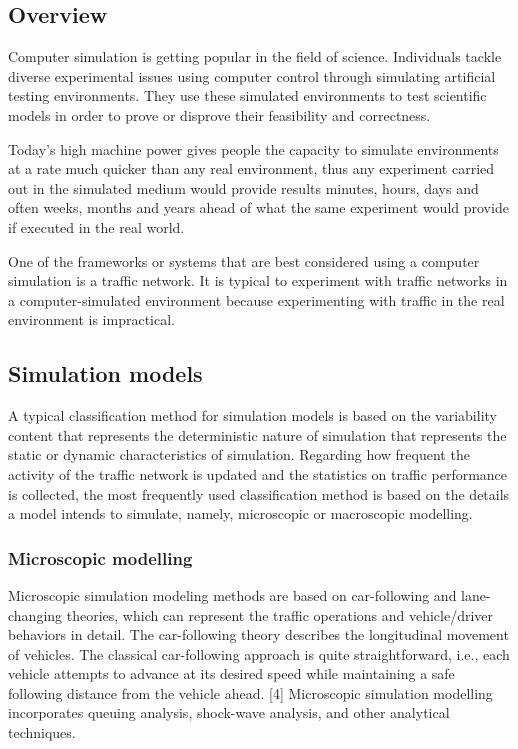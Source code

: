 \subsection{Overview}
	Computer simulation is getting popular in the field of science. Individuals tackle diverse experimental issues using computer control through simulating artificial testing environments. They use these simulated environments to test scientific models in order to prove or disprove their feasibility and correctness.
	 
	Today's high machine power gives people the capacity to simulate environments at a rate much quicker than any real environment, thus any experiment carried out in the simulated medium would provide results minutes, hours, days and often weeks, months and years ahead of what the same experiment would provide if executed in the real world.
	
	One of the frameworks or systems that are best considered using a computer simulation is a traffic network. It is typical to experiment with traffic networks in a computer-simulated environment because experimenting with traffic in the real environment is impractical. 

\subsection{Simulation models}
	A typical classification method for simulation models is based on the variability content that represents the deterministic nature of simulation that represents the static or dynamic characteristics of simulation. Regarding how frequent the activity of the traffic network is updated and the statistics on traffic performance is collected, the most frequently used classification method is based on the details a model intends to simulate, namely, microscopic or macroscopic modelling.
\subsubsection{Microscopic modelling}
	Microscopic simulation modeling methods are based on car-following and lane-changing theories, which can represent the traffic operations and vehicle/driver behaviors in detail. The car-following theory describes the longitudinal movement of vehicles. The classical car-following approach is quite straightforward, i.e., each vehicle attempts to advance at its desired speed while maintaining a safe following distance from the vehicle ahead. [4] Microscopic simulation modelling incorporates queuing analysis, shock-wave analysis, and other analytical techniques.
